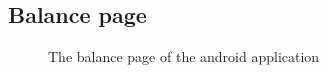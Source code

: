 \documentclass[11pt, a4paper]{article}
\begin{document}
\begin{appendices}
\subsection{Balance page} %
\begin{figure}[ht]
\centering
{}
\caption{The balance page of the android application}
\end{figure}
\clearpage


\end{appendices}
\end{document}

